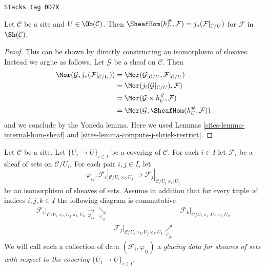 \begin{lemma}
\label{sites-lemma-hom-sheaf-hU}
\href{https://stacks.math.columbia.edu/tag/0D7X}{\texttt{Stacks tag 0D7X}}

Let $\mathcal{C}$ be a site and $U \in \Ob(\mathcal{C})$.
Then $\SheafHom(h_U^\#, \mathcal{F}) = j_*(\mathcal{F}|_{\mathcal{C}/U})$
for $\mathcal{F}$ in $\Sh(\mathcal{C})$.
\end{lemma}

\begin{proof}

This can be shown by directly constructing an isomorphism
of sheaves. Instead we argue as follows.
Let $\mathcal{G}$ be a sheaf on $\mathcal{C}$.
Then
\begin{align*}
\Mor(\mathcal{G}, j_*(\mathcal{F}|_{\mathcal{C}/U}))
& =
\Mor(\mathcal{G}|_{\mathcal{C}/U}, \mathcal{F}|_{\mathcal{C}/U}) \\
& =
\Mor(j_!(\mathcal{G}|_{\mathcal{C}/U}), \mathcal{F}) \\
& =
\Mor(\mathcal{G} \times h_U^\#, \mathcal{F}) \\
& =
\Mor(\mathcal{G}, \SheafHom(h_U^\#, \mathcal{F}))
\end{align*}
and we conclude by the Yoneda lemma. Here we used
Lemmas \ref{sites-lemma-internal-hom-sheaf} and
\ref{sites-lemma-compute-j-shriek-restrict}.
\end{proof}

Let $\mathcal{C}$ be a site.
Let $\{U_i \to U\}_{i \in I}$ be a covering of $\mathcal{C}$.
For each $i \in I$ let $\mathcal{F}_i$ be a sheaf of sets on
$\mathcal{C}/U_i$.
For each pair $i, j \in I$, let
$$
\varphi_{ij} :
\mathcal{F}_i|_{\mathcal{C}/U_i \times_U U_j}
\longrightarrow
\mathcal{F}_j|_{\mathcal{C}/U_i \times_U U_j}
$$
be an isomorphism of sheaves of sets. Assume in addition
that for every triple of indices $i, j, k \in I$ the
following diagram is commutative
$$
\begin{array}{ccc}\mathcal{F}_i|_{\mathcal{C}/U_i \times_U U_j \times_U U_k}
\underset{\varphi_{ik}}{\longrightarrow}\underset{\varphi_{ij}}{\searrow} &  & \mathcal{F}_k|_{\mathcal{C}/U_i \times_U U_j \times_U U_k} \\  & \mathcal{F}_j|_{\mathcal{C}/U_i \times_U U_j \times_U U_k}
\underset{\varphi_{jk}}{\nearrow} & \end{array}
$$
We will call such a collection of data
$(\mathcal{F}_i, \varphi_{ij})$
a {\it glueing data for sheaves of sets with respect to
the covering $\{U_i \to U\}_{i \in I}$}.

